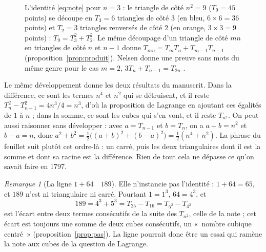 \documentclass[11pt,a4paper]{article}
\theoremstyle{remark}
\newtheorem*{remarque}{Remarque}
\begin{document}
\begin{figure}[H]
\caption{L'identité \eqref{eq:note} pour $n = 3$ : le triangle de côté
$n^2 = 9$ ($T_9 = 45$ points) se découpe en $T_3 = 6$ triangles de côté $3$
(en bleu, $6 \times 6 = 36$ points) et $T_2 = 3$ triangles renversés de côté
$2$ (en orange, $3 \times 3 = 9$ points) : $T_9 = T_3^2 + T_2^2$. Le même
découpage d'un triangle de côté $mn$ en triangles de côté $n$ et $n - 1$
donne $T_{mn} = T_m T_n + T_{m-1} T_{n-1}$ (proposition~\ref{prop:produit}).
Nelsen donne une preuve sans mots du même genre pour le cas $m = 2$,
$3T_n + T_{n-1} = T_{2n}$ \cite[p.~104]{nelsen}.}
\label{fig:note}
\end{figure}

Le même développement donne les deux résultats du manuscrit. Dans la
différence, ce sont les termes $n^4$ et $n^2$ qui se détruisent, et il reste
$T_n^2 - T_{n-1}^2 = 4n^3/4 = n^3$, d'où la proposition de Lagrange
en ajoutant ces égalités de $1$ à $n$ ; dans la somme, ce sont les cubes qui
s'en vont, et il reste $T_{n^2}$. On peut aussi raisonner sans développer :
avec $a = T_{n-1}$ et $b = T_n$, on a $a + b = n^2$ et $b - a = n$, donc
$a^2 + b^2 = \frac12\big((a+b)^2 + (b-a)^2\big) = \frac12(n^4+n^2)$. La
phrase du feuillet suit plutôt cet ordre-là : un carré, puis les deux
triangulaires dont il est la somme et dont sa racine est la différence.
Rien de tout cela ne dépasse ce qu'on savait faire en 1797.


\begin{remarque}[La ligne $1 + 64 \quad 189$]
Elle n'instancie pas l'identité : $1 + 64 = 65$, et $189$ n'est ni
triangulaire ni carré. Pourtant $1 = 1^3$, $64 = 4^3$, et
\[
189 = 4^3 + 5^3 = T_{25} - T_{16} = T_{5^2} - T_{4^2}
\]
est l'écart entre deux termes consécutifs de la suite des $T_{n^2}$, celle
de la note ; cet écart est toujours une somme de deux cubes consécutifs, un «~nombre
cubique centré~» \cite[A005898]{oeis}
(proposition~\ref{prop:pas}). La ligne pourrait donc être un essai qui
ramène la note aux cubes de la question de Lagrange.
\end{remarque}
\end{document}

